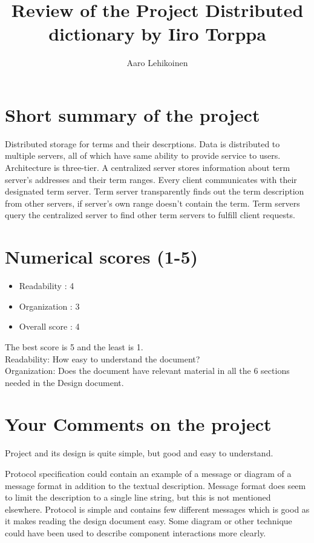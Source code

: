 \documentclass{article}
\begin{document}
\title{Review of the Project Distributed dictionary by Iiro Torppa}
\author{Aaro Lehikoinen} 
\maketitle
\section{Short summary of the project}
Distributed storage for terms and their descrptions. Data is distributed to multiple servers, all of which have same ability to provide service to users. Architecture is three-tier. A centralized server stores information about term server's addresses and their term ranges.
Every client communicates with their designated term server. Term server transparently finds out the term description from other servers, if server's own range doesn't contain the term.
Term servers query the centralized server to find other term servers to fulfill client requests.
\section{Numerical scores (1-5)}

\begin{itemize}
\item Readability : 4
\item Organization : 3
\item Overall score : 4
\end{itemize}

\noindent The best score is 5 and the least is 1.\\
Readability: How easy to understand the document? \\
Organization: Does the document have relevant material in all the 6 sections needed in  the Design document.\\
\section{Your Comments on the project}
Project and its design is quite simple, but good and easy to understand.

Protocol specification could contain an example of a message or diagram of a message format in addition to the textual description. Message format does seem to limit the description to a single line string, but this is not mentioned elsewhere. Protocol is simple and contains few different messages which is good as it makes reading the design document easy. Some diagram or other technique could have been used to describe component interactions more clearly.
\end{document}
